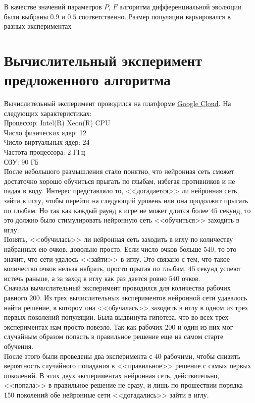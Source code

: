 \documentclass[12pt]{article}
\begin{document}
        В качестве значений параметров $P$, $F$ алгоритма дифференциальной эволюции были выбраны $0.9$ и $0.5$ соответственно. Размер популяции варьировался в разных экспериментах

\section{Вычислительный эксперимент предложенного алгоритма}
    Вычислительный эксперимент проводился на платформе \href{https://cloud.google.com/}{Google Cloud}. На следующих характеристиках: \\

    Процессор: Intel(R) Xeon(R) CPU \\
    Число физических ядер: 12 \\
    Число виртуальных ядер: 24 \\
    Частота процессора: 2 ГГц \\
    ОЗУ: 90 ГБ \\

    После небольшого размышления стало понятно, что нейронная сеть сможет достаточно хорошо обучиться прыгать по глыбам, избегая противников и не падая в воду. Интерес представляло то, <<догадается>> ли нейронная сеть зайти в иглу, чтобы перейти на следующий уровень или она продолжит прыгать по глыбам. Но так как каждый раунд в игре не может длится более $45$ секунд, то это должно было стимулировать нейронную сеть <<обучиться>> заходить в иглу. \\

    Понять, <<обучилась>> ли нейронная сеть заходить в иглу по количеству набранных ею очков, довольно просто. Если число очков больше $540$, то это значит, что сети удалось <<зайти>> в иглу. Это связано с тем, что такое количество очков нельзя набрать, просто прыгая по глыбам, $45$ секунд успеют истечь раньше, а за заход в иглу как раз дается ровно $540$ очков. \\

    Сначала вычислительный эксперимент проводился для количества рабочих равного $200$. Из трех вычислительных экспериментов нейронной сети удавалось найти решение, в котором она <<обучалась>> заходить в иглу в одном из трех первых поколений популяции. Была выдвинута гипотеза, что во всех трех экспериментах нам просто повезло. Так как рабочих $200$ и один из них мог случайным образом попасть в правильное решение еще на самом старте обучения. \\

    После этого были проведены два эксперимента с $40$ рабочими, чтобы снизить вероятность случайного попадания в <<правильное>> решение с самых первых поколений. В этих двух экспериментах нейронная сеть, действительно, <<попала>> в правильное решение не сразу, и лишь по прошествии порядка 150 поколений обе нейронные сети <<догадались>> зайти в иглу. \\
\end{document}
